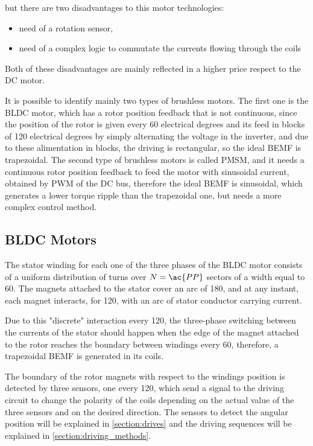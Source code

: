 but there are two disadvantages to this motor technologies: 

\begin{itemize}
	\item need of a rotation sensor,
	\item need of a complex logic to commutate the currents flowing through the coils
\end{itemize}

Both of these disadvantages are mainly reflected in a higher price respect to the \ac{DC} motor.

It is possible to identify mainly two types of brushless motors. The first one is the \acf{BLDC} motor, which has a rotor position feedback that is not continuous, since the position of the rotor is given every 60 electrical degrees and its feed in blocks of 120 electrical degrees by simply alternating the voltage in the inverter, and due to these alimentation in blocks, the driving is rectangular, so the ideal \ac{BEMF} is trapezoidal. The second type of brushless motors is called \acf{PMSM}, and it needs a continuous rotor position feedback to feed the motor with sinusoidal current, obtained by \acf{PWM} of the \ac{DC} bus, therefore the ideal \ac{BEMF} is sinusoidal, which generates a lower torque ripple than the trapezoidal one, but needs a more complex control method.

\subsection{BLDC Motors}

The stator winding for each one of the three phases of the \ac{BLDC} motor consists of a uniform distribution of turns over $N=\ac{PP}$ sectors of a width equal to 60\degree. The magnets attached to the stator cover an arc of 180\degree, and at any instant, each magnet interacts, for 120\degree, with an arc of stator conductor carrying current.

Due to this "discrete" interaction every 120\degree, the three-phase switching between the currents of the stator should happen when the edge of the magnet attached to the rotor reaches the boundary between windings every 60\degree, therefore, a trapezoidal \ac{BEMF} is generated in its coils.

The boundary of the rotor magnets with respect to the windings position is detected by three sensors, one every 120\degree, which send a signal to the driving circuit to change the polarity of the coils depending on the actual value of the three sensors and on the desired direction. The sensors to detect the angular position will be explained in \ref{section:drives} and the driving sequences will be explained in \ref{section:driving_methods}.


